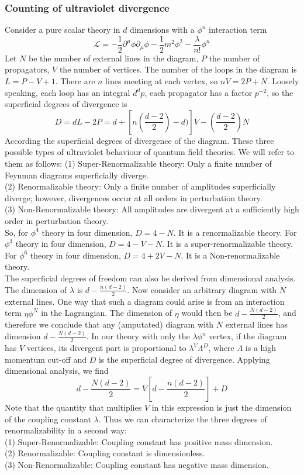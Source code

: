 \documentclass{article}
\begin{document}
\subsubsection{Counting of ultraviolet divergence}
Consider a pure scalar theory in $d$ dimensions with a $\phi^n$ interaction term
\[\mathcal{L} = -\frac{1}{2} \partial^{\mu} \phi \partial_{\mu} \phi -\frac{1}{2}m^2 \phi^2 - \frac{\lambda}{n!}\phi^n\]
Let $N$ be the number of external lines in the diagram, $P$ the number of propagators, $V$ the number of vertices. The number of the loops in the diagram is $L=P-V+1$.  There are $n$ lines meeting at each vertex, so $nV = 2P+N$. Loosely speaking, each loop has an integral $d^d p$, each propagator has a factor $p^{-2}$, so the superficial degrees of divergence is
\[D = dL - 2P = d + [n(\frac{d-2}{2})-d)]V - (\frac{d-2}{2})N\]
According the superficial degrees of divergence of the diagram. These three possible types of ultraviolet behaviour of quantum field theories. We will refer to them as follows:
(1) Super-Renormalizable theory: Only a finite number of Feynman diagrams superficially diverge.\\
(2) Renormalizable theory: Only a finite number of amplitudes superficially diverge; however, divergences
occur at all orders in perturbation theory. \\
(3) Non-Renormalizable theory: All amplitudes are divergent at a sufficiently high order in perturbation
theory.\\
So, for $\phi^4$ theory in four dimension, $D = 4 - N$. It is a renormalizable theory. For $\phi^3$ theory in four dimension, $D = 4 - V -N$. It is a super-renormalizable theory. For $\phi^6$ theory in four dimension, $D = 4 + 2V -N$. It is a Non-renormalizable theory. \\
The superficial degrees of freedom can also be derived from dimensional analysis. The dimension of $\lambda$ is $d - \frac{n(d-2)}{2}$. Now consider an arbitrary diagram with $N$ external lines. One way that such a diagram could arise is from an interaction term $\eta \phi^N$ in the Lagrangian. The dimension of $\eta$ would then be $d - \frac{N(d-2)}{2}$, and therefore we conclude that any (amputated) diagram with $N$ external lines has dimension $d - \frac{N(d-2)}{2}$. In our theory with only the $\lambda \phi^n$ vertex, if the diagram has $V$ vertices, its divergent part is proportional to $\lambda^V \Lambda^D$, where $\Lambda$ is a high momentum cut-off and $D$ is the superficial degree of divergence.  Applying dimensional analysis, we find
\[d - \frac{N(d-2)}{2} = V[d - \frac{n(d-2)}{2}] + D\]
Note that the quantity that multiplies $V$ in this expression is just the dimension of the coupling constant $\lambda$. Thus we can characterize the three degrees of renormalizability in a second way:\\
(1) Super-Renormalizable: Coupling constant has positive mass dimension.\\
(2) Renormalizable: Coupling constant is dimensionless.\\
(3) Non-Renormalizable: Coupling constant has negative mass dimension.
\end{document}
